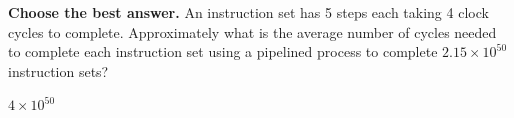 \documentclass{exam}
\newcommand{\itemSpace}{36pt} %
\begin{document}
\begin{questions} %
\setlength\itemsep{5pt} 

\question \textbf{Choose the best answer.}
        An instruction set has 5 steps each taking 4 clock cycles to complete. 
        Approximately what is the average number of cycles needed to complete each instruction set using a pipelined process to complete 
        $2.15\times 10^{50}$ instruction sets?
        
		\begin{choices}
			\choice ${4}\times 10^{50}$
		\end{choices}%
		

\end{questions}
\end{document}
